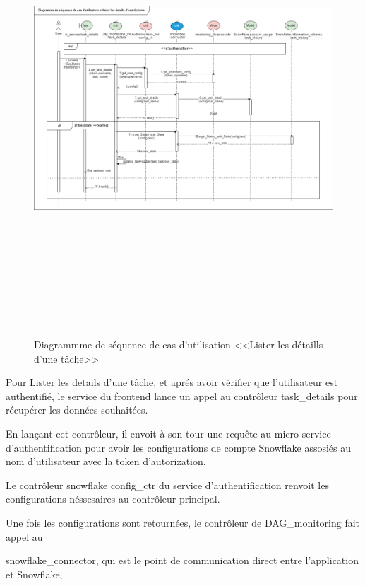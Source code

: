     \begin{figure}[H]
        \centering
        \includegraphics[width=1\linewidth ,height=17cm]{img/conception/seq2.png}
        \caption{Diagrammme de séquence de cas d'utilisation <<Lister les détaills d'une tâche>> }
        \label{fig:seq2}
    \end{figure}
    \par Pour Lister les details d'une tâche, et aprés avoir vérifier que l'utilisateur est authentifié, le service du frontend lance un appel au contrôleur task\_details 
    pour récupérer les données souhaitées. 
    \par En lançant cet contrôleur, il envoit à son tour une requête au micro-service d'authentification pour avoir les configurations de compte Snowflake assosiés au nom d'utilisateur avec la token d'autorization.
    \par Le contrôleur snowflake config\_ctr du service d'authentification renvoit les configurations néssesaires au contrôleur principal.
    \par Une fois les configurations sont retournées, le contrôleur de DAG\_monitoring fait appel au \par snowflake\_connector, qui est le point de communication direct entre l'application et Snowflake, 
